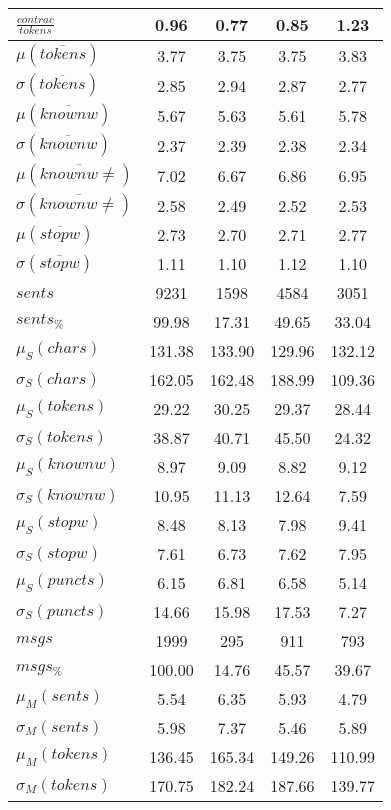 \begin{table}[h!]
\begin{center}
\begin{tabular}{| l || c | c | c | c |}
$\frac{contrac}{tokens}$ & 0.96  & 0.77  & 0.85  & 1.23 \\\hline\hline
$\mu(\overline{tokens})$ & 3.77  & 3.75  & 3.75  & 3.83 \\
$\sigma(\overline{tokens})$ & 2.85  & 2.94  & 2.87  & 2.77 \\\hline
$\mu(\overline{knownw})$ & 5.67  & 5.63  & 5.61  & 5.78 \\
$\sigma(\overline{knownw})$ & 2.37  & 2.39  & 2.38  & 2.34 \\\hline
$\mu(\overline{knownw \neq})$ & 7.02  & 6.67  & 6.86  & 6.95 \\
$\sigma(\overline{knownw \neq})$ & 2.58  & 2.49  & 2.52  & 2.53 \\\hline
$\mu(\overline{stopw})$ & 2.73  & 2.70  & 2.71  & 2.77 \\
$\sigma(\overline{stopw})$ & 1.11  & 1.10  & 1.12  & 1.10 \\\hline\hline
$sents$ & 9231  & 1598  & 4584  & 3051 \\
$sents_{\%}$ & 99.98  & 17.31  & 49.65  & 33.04 \\\hline
$\mu_S(chars)$ & 131.38  & 133.90  & 129.96  & 132.12 \\
$\sigma_S(chars)$ & 162.05  & 162.48  & 188.99  & 109.36 \\\hline
$\mu_S(tokens)$ & 29.22  & 30.25  & 29.37  & 28.44 \\
$\sigma_S(tokens)$ & 38.87  & 40.71  & 45.50  & 24.32 \\\hline
$\mu_S(knownw)$ & 8.97  & 9.09  & 8.82  & 9.12 \\
$\sigma_S(knownw)$ & 10.95  & 11.13  & 12.64  & 7.59 \\\hline
$\mu_S(stopw)$ & 8.48  & 8.13  & 7.98  & 9.41 \\
$\sigma_S(stopw)$ & 7.61  & 6.73  & 7.62  & 7.95 \\\hline
$\mu_S(puncts)$ & 6.15  & 6.81  & 6.58  & 5.14 \\
$\sigma_S(puncts)$ & 14.66  & 15.98  & 17.53  & 7.27 \\\hline\hline
$msgs$ & 1999  & 295  & 911  & 793 \\
$msgs_{\%}$ & 100.00  & 14.76  & 45.57  & 39.67 \\\hline
$\mu_M(sents)$ & 5.54  & 6.35  & 5.93  & 4.79 \\
$\sigma_M(sents)$ & 5.98  & 7.37  & 5.46  & 5.89 \\\hline
$\mu_M(tokens)$ & 136.45  & 165.34  & 149.26  & 110.99 \\
$\sigma_M(tokens)$ & 170.75  & 182.24  & 187.66  & 139.77 \\\hline

\end{tabular}
\end{center}
\end{table}
